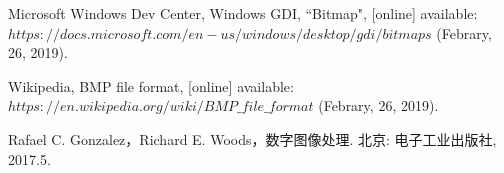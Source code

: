 \documentclass[UTF8]{ctexart}
\begin{document}
\begin{thebibliography}{}
     Microsoft Windows Dev Center, 
    Windows GDI, ``Bitmap", [online] available: 
    \newline $https://docs.microsoft.com/en-us/windows/desktop/gdi/bitmaps$  
    (Febrary, 26, 2019).

	 Wikipedia, BMP file format, [online] available: \newline 
	$https://en.wikipedia.org/wiki/BMP\_file\_format$ (Febrary, 26, 2019).

	 Rafael C. Gonzalez，Richard E. Woods，数字图像处理. 北京: 电子工业出版社, 2017.5.

\end{thebibliography}

\clearpage
\end{document}
